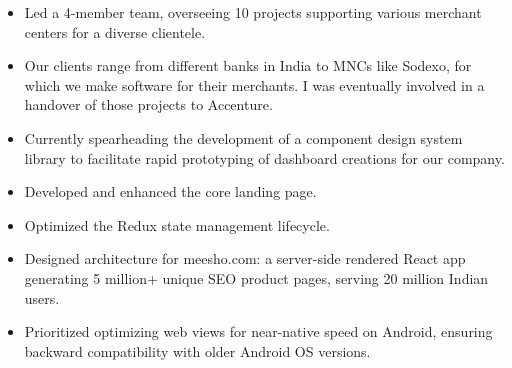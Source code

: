 \documentclass[10pt,a4paper,ragged2e,withhyper]{altacv}
\begin{document}
\begin{paracol}{2}


\begin{itemize}
                \item Led a 4-member team, overseeing 10 projects supporting various merchant centers for a diverse clientele.
                \item Our clients range from different banks in India to MNCs like Sodexo, for which we make software for their merchants.  I was eventually involved in a handover of those projects to Accenture.
                \item Currently spearheading the development of a component design system library to facilitate rapid prototyping of dashboard creations for our company.
                \end{itemize}
                \divider
                

                \begin{itemize}
                \item Developed and enhanced the core landing page.
                \item Optimized the Redux state management lifecycle.
                \end{itemize}
                
                \divider
                
                \begin{itemize}
                \item Designed architecture for meesho.com: a server-side rendered React app generating 5 million+ unique SEO product pages, serving 20 million Indian users.
                \item Prioritized optimizing web views for near-native speed on Android, ensuring backward compatibility with older Android OS versions.
                \end{itemize}
                
                \divider
                

\end{paracol}
\end{document}
